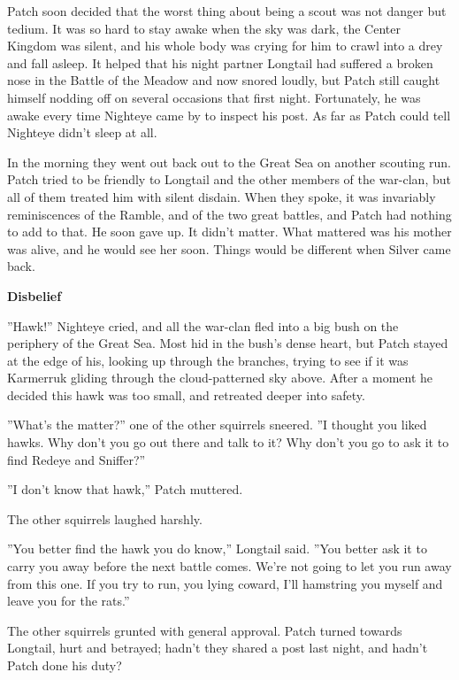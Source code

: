 \documentclass[11pt]{article}
\begin{document}
 Patch soon decided that the worst thing about being a scout was not danger but tedium. It was so hard to stay awake when the sky was dark, the Center Kingdom was silent, and his whole body was crying for him to crawl into a drey and fall asleep. It helped that his night partner Longtail had suffered a broken nose in the Battle of the Meadow and now snored loudly, but Patch still caught himself nodding off on several occasions that first night. Fortunately, he was awake every time Nighteye came by to inspect his post. As far as Patch could tell Nighteye didn't sleep at all.\par
 In the morning they went out back out to the Great Sea on another scouting run. Patch tried to be friendly to Longtail and the other members of the war-clan, but all of them treated him with silent disdain. When they spoke, it was invariably reminiscences of the Ramble, and of the two great battles, and Patch had nothing to add to that. He soon gave up. It didn't matter. What mattered was his mother was alive, and he would see her soon. Things would be different when Silver came back.\par
\par
{\bf Disbelief\par
}\par
 ''Hawk!'' Nighteye cried, and all the war-clan fled into a big bush on the periphery of the Great Sea. Most hid in the bush's dense heart, but Patch stayed at the edge of his, looking up through the branches, trying to see if it was Karmerruk gliding through the cloud-patterned sky above. After a moment he decided this hawk was too small, and retreated deeper into safety.\par
 ''What's the matter?'' one of the other squirrels sneered. ''I thought you liked hawks. Why don't you go out there and talk to it? Why don't you go to ask it to find Redeye and Sniffer?''\par
 ''I don't know that hawk,'' Patch muttered.\par
 The other squirrels laughed harshly.\par
 ''You better find the hawk you do know,'' Longtail said. ''You better ask it to carry you away before the next battle comes. We're not going to let you run away from this one. If you try to run, you lying coward, I'll hamstring you myself and leave you for the rats.''\par
 The other squirrels grunted with general approval. Patch turned towards Longtail, hurt and betrayed; hadn't they shared a post last night, and hadn't Patch done his duty?\par
\end{document}
